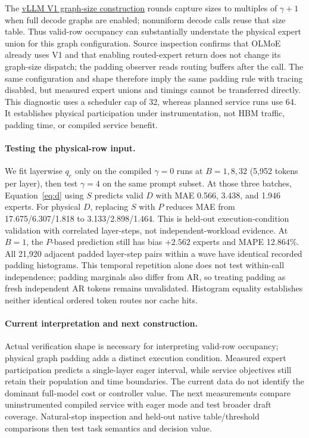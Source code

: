 \documentclass[10pt,twocolumn]{article}
\begin{document}
The \href{https://github.com/vllm-project/vllm/blob/v0.26.0/vllm/config/compilation.py}{vLLM V1 graph-size construction} rounds capture sizes to multiples of $\gamma+1$ when full decode graphs are enabled; nonuniform decode calls reuse that size table. Thus valid-row occupancy can substantially understate the physical expert union for this graph configuration. Source inspection confirms that OLMoE already uses V1 and that enabling routed-expert return does not change its graph-size dispatch; the padding observer reads routing buffers after the call. The same configuration and shape therefore imply the same padding rule with tracing disabled, but measured expert unions and timings cannot be transferred directly. This diagnostic uses a scheduler cap of 32, whereas planned service runs use 64. It establishes physical participation under instrumentation, not HBM traffic, padding time, or compiled service benefit.

\paragraph{Testing the physical-row input.} We fit layerwise $q_e$ only on the compiled $\gamma=0$ runs at $B=1,8,32$ (5,952 tokens per layer), then test $\gamma=4$ on the same prompt subset. At those three batches, Equation~\ref{eq:d} using $S$ predicts valid $D$ with MAE 0.566, 3.438, and 1.946 experts. For physical $D$, replacing $S$ with $P$ reduces MAE from 17.675/6.307/1.818 to 3.133/2.898/1.464. This is held-out execution-condition validation with correlated layer-steps, not independent-workload evidence. At $B=1$, the $P$-based prediction still has bias $+2.562$ experts and MAPE 12.864\%. All 21,920 adjacent padded layer-step pairs within a wave have identical recorded padding histograms. This temporal repetition alone does not test within-call independence; padding marginals also differ from AR, so treating padding as fresh independent AR tokens remains unvalidated. Histogram equality establishes neither identical ordered token routes nor cache hits.

\paragraph{Current interpretation and next construction.} Actual verification shape is necessary for interpreting valid-row occupancy; physical graph padding adds a distinct execution condition. Measured expert participation predicts a single-layer eager interval, while service objectives still retain their population and time boundaries. The current data do not identify the dominant full-model cost or controller value. The next measurements compare uninstrumented compiled service with eager mode and test broader draft coverage. Natural-stop inspection and held-out native table/threshold comparisons then test task semantics and decision value.
\end{document}
